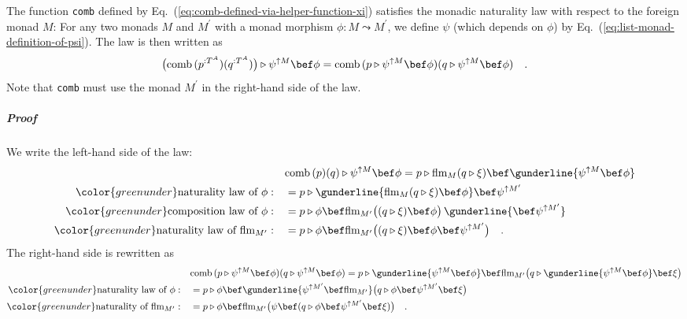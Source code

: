The function \lstinline!comb! defined by Eq.~(\ref{eq:comb-defined-via-helper-function-xi})
satisfies the monadic naturality law with respect to the foreign monad
$M$: For any two monads $M$ and $M^{\prime}$ with a monad morphism
$\phi:M\leadsto M^{\prime}$, we define $\psi$ (which depends on
$\phi$) by Eq.~(\ref{eq:list-monad-definition-of-psi}). The law
is then written as
\[
\big(\text{comb}\,(p^{:T^{A}})(q^{:T^{A}})\big)\triangleright\psi^{\uparrow M}\bef\phi=\text{comb}\,(p\triangleright\psi^{\uparrow M}\bef\phi)(q\triangleright\psi^{\uparrow M}\bef\phi)\quad.
\]
Note that \lstinline!comb! must use the monad $M^{\prime}$ in the
right-hand side of the law.

\subparagraph{Proof}

We write the left-hand side of the law:
\begin{align*}
 & \text{comb}\,(p)(q)\triangleright\psi^{\uparrow M}\bef\phi=p\triangleright\text{flm}_{M}(q\triangleright\xi)\bef\gunderline{\psi^{\uparrow M}\bef\phi}\\
{\color{greenunder}\text{naturality law of }\phi:}\quad & =p\triangleright\gunderline{\text{flm}_{M}(q\triangleright\xi)\bef\phi}\bef\psi^{\uparrow M^{\prime}}\\
{\color{greenunder}\text{composition law of }\phi:}\quad & =p\triangleright\phi\bef\text{flm}_{M^{\prime}}\big((q\triangleright\xi)\bef\phi\big)\,\gunderline{\bef\psi^{\uparrow M^{\prime}}}\\
{\color{greenunder}\text{naturality law of }\text{flm}_{M^{\prime}}:}\quad & =p\triangleright\phi\bef\text{flm}_{M^{\prime}}\big((q\triangleright\xi)\bef\phi\bef\psi^{\uparrow M^{\prime}}\big)\quad.
\end{align*}
The right-hand side is rewritten as
\begin{align*}
 & \text{comb}\,(p\triangleright\psi^{\uparrow M}\bef\phi)(q\triangleright\psi^{\uparrow M}\bef\phi)=p\triangleright\gunderline{\psi^{\uparrow M}\bef\phi}\bef\text{flm}_{M^{\prime}}\big(q\triangleright\gunderline{\psi^{\uparrow M}\bef\phi}\bef\xi\big)\\
{\color{greenunder}\text{naturality law of }\phi:}\quad & =p\triangleright\phi\bef\gunderline{\psi^{\uparrow M^{\prime}}\bef\text{flm}_{M^{\prime}}}\big(q\triangleright\phi\bef\psi^{\uparrow M^{\prime}}\bef\xi\big)\\
{\color{greenunder}\text{naturality of }\text{flm}_{M^{\prime}}:}\quad & =p\triangleright\phi\bef\text{flm}_{M^{\prime}}\big(\psi\bef(q\triangleright\phi\bef\psi^{\uparrow M^{\prime}}\bef\xi)\big)\quad.
\end{align*}
